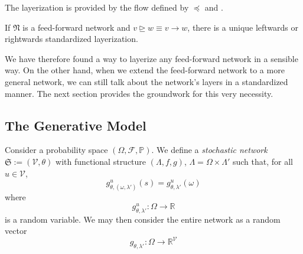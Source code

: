 \documentclass[a4paper,11pt]{report}
\begin{document}
\begin{Bew}
The layerization is provided by the flow defined by $\preceq$ and .
\end{Bew}

\begin{Cor}\label{cor:standardized-layerization-feedforward}
If $\mathfrak{N}$ is a feed-forward network and $v\trianglerighteq w\equiv v\to w$, there is a unique leftwards or rightwards standardized layerization.
\end{Cor}

\begin{Par}
We have therefore found a way to layerize any feed-forward network in a sensible way. On the other hand, when we extend the feed-forward network to a more general network, we can still talk about the network's layers in a standardized manner. The next section provides the groundwork for this very necessity.
\end{Par}

\subsection{The Generative Model}\label{subsec:theory-structure-predicode}

\begin{Def}
Consider a probability space $(\Omega,\mathcal{F},\mathbb{P})$. We define a \emph{stochastic network} $\mathfrak{S}:=(\mathcal{V},\theta)$ with functional structure $(\Lambda,f,g)$, $\Lambda=\Omega\times\Lambda'$ such that, for all $u\in\mathcal{V}$,
\begin{equation}
g^u_{\theta,(\omega,\lambda')}\left(s\right)=g^u_{\theta,\lambda'}(\omega)
\end{equation}
where
\[
g^u_{\theta,\lambda'}:\Omega\to\mathbb{R}
\]
is a random variable. We may then consider the entire network as a random vector
\[
g_{\theta,\lambda'}:\Omega\to\mathbb{R}^{\mathcal{V}}
\]
\end{Def}
\end{document}
